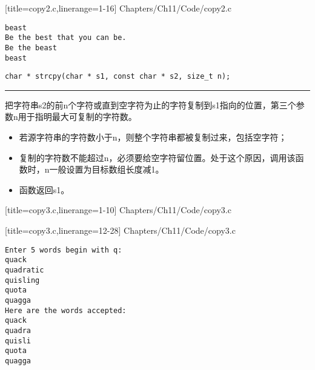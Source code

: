 \begin{frame}[fragile]

[title=copy2.c,linerange={1-16}]
{Chapters/Ch11/Code/copy2.c}
\end{frame}

\begin{frame}[fragile]
\begin{lstlisting}[basicstyle=\ttfamily]
beast
Be the best that you can be.
Be the beast
beast
\end{lstlisting}

\end{frame}

\begin{frame}[fragile] 
\begin{lstlisting}[title=strncpy函数原型, basicstyle=\ttfamily]
char * strcpy(char * s1, const char * s2, size_t n);
\end{lstlisting}
\rule{\textwidth}{0.3mm} \vspace{0.3mm}

把字符串s2的前n个字符或直到空字符为止的字符复制到s1指向的位置，第三个参数n用于指明最大可复制的字符数。
\begin{itemize}
\item 
若源字符串的字符数小于n，则整个字符串都被复制过来，包括空字符；
\item
复制的字符数不能超过n，必须要给空字符留位置。处于这个原因，调用该函数时，n一般设置为目标数组长度减1。
\item
函数返回s1。
\end{itemize}
\end{frame}


\begin{frame}[fragile]

[title=copy3.c,linerange={1-10}]
{Chapters/Ch11/Code/copy3.c}
\end{frame}

\begin{frame}[fragile]

[title=copy3.c,linerange={12-28}]
{Chapters/Ch11/Code/copy3.c}
\end{frame}


\begin{frame}[fragile]
\begin{lstlisting}[basicstyle=\ttfamily]
Enter 5 words begin with q:
quack
quadratic
quisling
quota
quagga
Here are the words accepted:
quack
quadra
quisli
quota
quagga
\end{lstlisting}
\end{frame}


